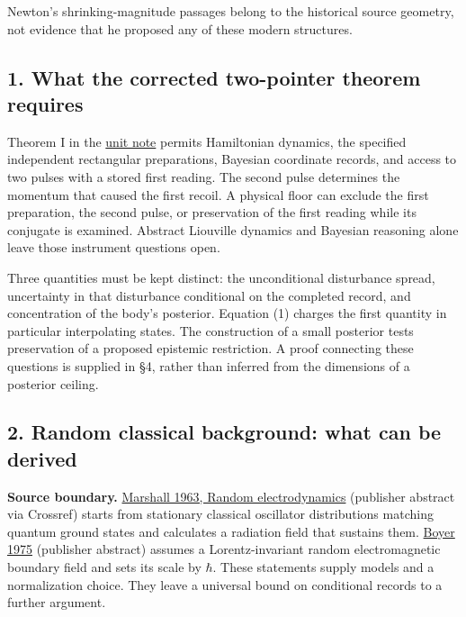 \documentclass[11pt,a4paper]{article}
\begin{document}
Newton's shrinking-magnitude passages belong to the historical source
geometry, not evidence that he proposed any of these modern structures.

\hypertarget{what-the-corrected-two-pointer-theorem-requires}{%
\subsection{1. What the corrected two-pointer theorem
requires}\label{what-the-corrected-two-pointer-theorem-requires}}

Theorem I in the \href{necessity-unit-and-indeterminacy.md}{unit note}
permits Hamiltonian dynamics, the specified independent rectangular
preparations, Bayesian coordinate records, and access to two pulses with
a stored first reading. The second pulse determines the momentum that
caused the first recoil. A physical floor can exclude the first
preparation, the second pulse, or preservation of the first reading
while its conjugate is examined. Abstract Liouville dynamics and
Bayesian reasoning alone leave those instrument questions open.

Three quantities must be kept distinct: the unconditional disturbance
spread, uncertainty in that disturbance conditional on the completed
record, and concentration of the body's posterior. Equation (1) charges
the first quantity in particular interpolating states. The construction
of a small posterior tests preservation of a proposed epistemic
restriction. A proof connecting these questions is supplied in §4,
rather than inferred from the dimensions of a posterior ceiling.

\hypertarget{random-classical-background-what-can-be-derived}{%
\subsection{2. Random classical background: what can be
derived}\label{random-classical-background-what-can-be-derived}}

\textbf{Source boundary.}
\href{https://doi.org/10.1098/rspa.1963.0220}{Marshall 1963, Random
electrodynamics} (publisher abstract via Crossref) starts from
stationary classical oscillator distributions matching quantum ground
states and calculates a radiation field that sustains them.
\href{https://doi.org/10.1103/PhysRevD.11.790}{Boyer 1975} (publisher
abstract) assumes a Lorentz-invariant random electromagnetic boundary
field and sets its scale by \(\hbar\). These statements supply models
and a normalization choice. They leave a universal bound on conditional
records to a further argument.
\end{document}
